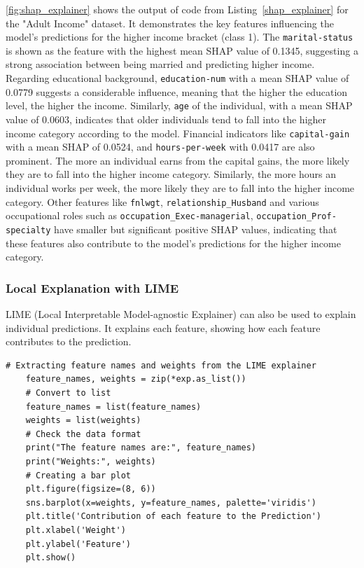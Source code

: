 \documentclass[10pt,journal,compsoc]{IEEEtran}
\begin{document}
\autoref{fig:shap_explainer} shows the output of code from Listing~\ref{shap_explainer} for the "Adult Income" dataset. It demonstrates the key features influencing the model's predictions for the higher income bracket (class 1).
The \texttt{marital-status} is shown as the feature with the highest mean SHAP value of 0.1345, suggesting a strong association between being married and predicting higher income.
Regarding educational background, \texttt{education-num} with a mean SHAP value of 0.0779 suggests a considerable influence, meaning that the higher the education level, the higher the income. Similarly, 
\texttt{age} of the individual, with a mean SHAP value of 0.0603, indicates that older individuals tend to fall into the higher income category according to the model.
Financial indicators like \texttt{capital-gain} with a mean SHAP of 0.0524, and \texttt{hours-per-week} with 0.0417 are also prominent.
The more an individual earns from the capital gains, the more likely they are to fall into the higher income category. Similarly, the more hours an individual works per week, the more likely they are to fall into the higher income category.
Other features like \texttt{fnlwgt}, \texttt{relationship\_Husband} and various occupational roles such as \texttt{occupation\_Exec-managerial}, \texttt{occupation\_Prof-specialty} have smaller but significant positive SHAP values, indicating that these features also contribute to the model's predictions for the higher income category.


\subsubsection{Local Explanation with LIME}
LIME (Local Interpretable Model-agnostic Explainer) can also be used to explain individual predictions. It explains each feature, showing how each feature contributes to the prediction.

\begin{lstlisting}[caption=LIME Explainer , label=lime_explainer]
    # Extracting feature names and weights from the LIME explainer
    feature_names, weights = zip(*exp.as_list())    
    # Convert to list
    feature_names = list(feature_names)
    weights = list(weights)    
    # Check the data format
    print("The feature names are:", feature_names)
    print("Weights:", weights)    
    # Creating a bar plot
    plt.figure(figsize=(8, 6))
    sns.barplot(x=weights, y=feature_names, palette='viridis')
    plt.title('Contribution of each feature to the Prediction')
    plt.xlabel('Weight')
    plt.ylabel('Feature')
    plt.show()
\end{lstlisting}
\end{document}
